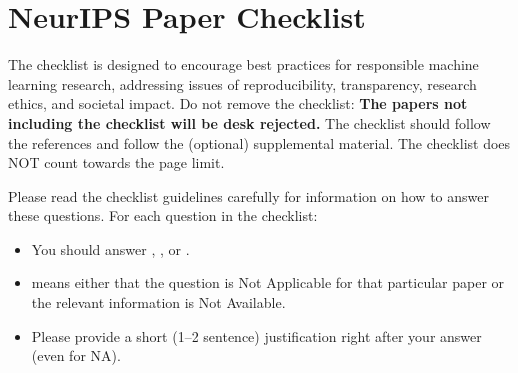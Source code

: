 \documentclass{article}
\theoremstyle{plain}
\theoremstyle{definition}
\theoremstyle{remark}
\begin{document}


\clearpage




\clearpage
\newpage
\section*{NeurIPS Paper Checklist}

The checklist is designed to encourage best practices for responsible machine learning research, addressing issues of reproducibility, transparency, research ethics, and societal impact. Do not remove the checklist: {\bf The papers not including the checklist will be desk rejected.} The checklist should follow the references and follow the (optional) supplemental material.  The checklist does NOT count towards the page
limit. 

Please read the checklist guidelines carefully for information on how to answer these questions. For each question in the checklist:
\begin{itemize}
    \item You should answer \answerYes{}, \answerNo{}, or \answerNA{}.
    \item \answerNA{} means either that the question is Not Applicable for that particular paper or the relevant information is Not Available.
    \item Please provide a short (1–2 sentence) justification right after your answer (even for NA). 
\end{itemize}
\end{document}
